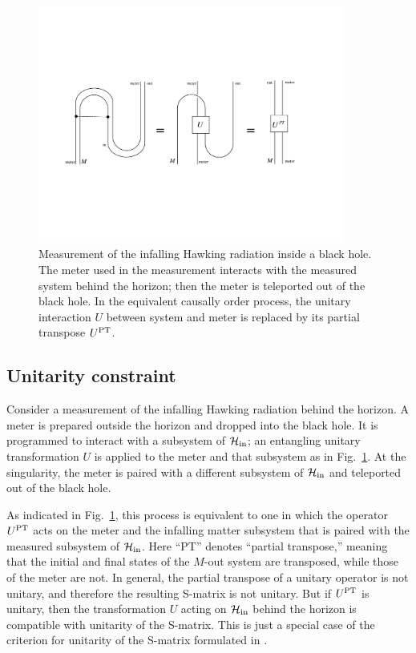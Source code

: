 \documentclass[11pt]{article}
\begin{document}
\begin{figure}[t]
\begin{center}
\includegraphics[width=0.9\textwidth]{inside-measure.pdf}
\end{center}
\caption{Measurement of the infalling Hawking radiation inside a black hole. The meter used in the measurement interacts with the measured system behind the horizon; then the meter is teleported out of the black hole. In the equivalent causally order process, the unitary interaction $U$ between system and meter is replaced by its partial transpose $U^{\rm PT}$.}
\label{fig:inside-measure}
\end{figure}

\subsection{Unitarity constraint}

Consider a measurement of the infalling Hawking radiation behind the horizon. A meter is prepared outside the horizon and dropped into the black hole. It is programmed to interact with a subsystem of $\mathcal{H}_{\rm in}$; an entangling unitary transformation $U$ is applied to the meter and that subsystem as in Fig.~\ref{fig:inside-measure}. At the singularity, the meter is paired with a different subsystem of $\mathcal{H}_{\rm in}$ and teleported out of the black hole.

As indicated in Fig.~\ref{fig:inside-measure}, this process is equivalent to one in which the operator $U^{\rm PT}$ acts on the meter and the infalling matter subsystem that is paired with the measured subsystem of $\mathcal{H}_{\rm in}$. Here ``PT'' denotes ``partial transpose,'' meaning that the initial and final states of the $M$-out system are transposed, while those of the meter are not. In general, the partial transpose of a unitary operator is not unitary, and therefore the resulting S-matrix is not unitary. But if $U^{\rm PT}$ is unitary, then the transformation $U$ acting on $\mathcal{H}_{\rm in}$ behind the horizon is compatible with unitarity of the S-matrix. This is just a special case of the criterion for unitarity of the S-matrix formulated in \cite{gottesman}.
\end{document}
